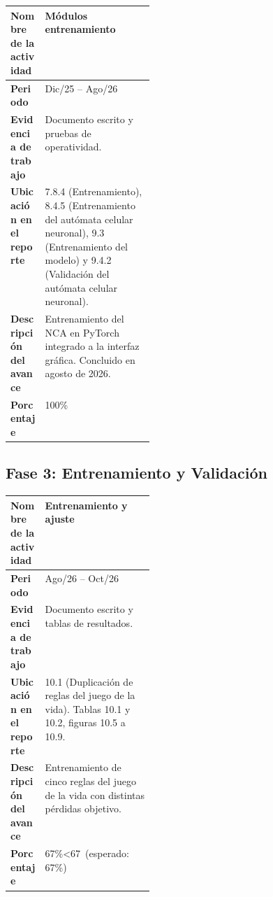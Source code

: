 \documentclass[letterpaper,10pt,oneside]{article}
\def\espEntrenamiento{67}   \def\realEntrenamiento{67}
\newcommand\porcentaje[2]{#2\%\ifnum#2<#1\ (esperado: #1\%)\fi}
\begin{document}
	\begin{table}[H]
		\centering
		\renewcommand{\arraystretch}{1.25}
		\begin{tabularx}{\linewidth}{|>{\raggedright\bfseries\arraybackslash}p{0.24\linewidth}|X|}
			\hline
			\rowcolor{encabezado}
			Nombre de la actividad & \textbf{Módulos entrenamiento} \\ \hline
			Periodo & Dic/25 -- Ago/26 \\ \hline
			Evidencia de trabajo & Documento escrito y pruebas de operatividad. \\ \hline
			Ubicación en el reporte & 7.8.4 (Entrenamiento), 8.4.5 (Entrenamiento del autómata celular neuronal), 9.3 (Entrenamiento del modelo) y 9.4.2 (Validación del autómata celular neuronal). \\ \hline
			Descripción del avance & Entrenamiento del NCA en PyTorch integrado a la interfaz gráfica. Concluido en agosto de 2026. \\ \hline
			Porcentaje & 100\% \\ \hline
		\end{tabularx}
	\end{table}

	\subsection*{Fase 3: Entrenamiento y Validación}

	\begin{table}[H]
		\centering
		\renewcommand{\arraystretch}{1.25}
		\begin{tabularx}{\linewidth}{|>{\raggedright\bfseries\arraybackslash}p{0.24\linewidth}|X|}
			\hline
			\rowcolor{encabezado}
			Nombre de la actividad & \textbf{Entrenamiento y ajuste} \\ \hline
			Periodo & Ago/26 -- Oct/26 \\ \hline
			Evidencia de trabajo & Documento escrito y tablas de resultados. \\ \hline
			Ubicación en el reporte & 10.1 (Duplicación de reglas del juego de la vida). Tablas 10.1 y 10.2, figuras 10.5 a 10.9. \\ \hline
			Descripción del avance & Entrenamiento de cinco reglas del juego de la vida con distintas pérdidas objetivo. \\ \hline
			Porcentaje & \porcentaje{\espEntrenamiento}{\realEntrenamiento} \\ \hline
		\end{tabularx}
	\end{table}
\end{document}
